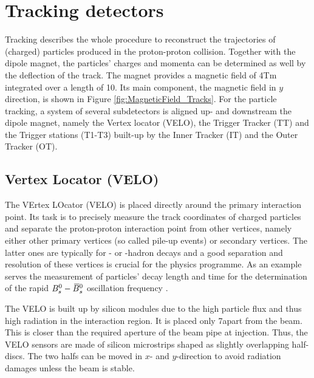 \section{Tracking detectors}
Tracking describes the whole procedure to reconstruct the trajectories of (charged) particles produced in the proton-proton collision. 
Together with the dipole magnet, the particles' charges and momenta can be determined as well by the deflection of the track.
The magnet provides a magnetic field of 4\unit{Tm} integrated over a length of 10\m.
Its main component, the magnetic field in $y$ direction, is shown in Figure \ref{fig:MagneticField_Tracks}.
For the particle tracking, a system of several subdetectors is aligned up- and downstream the dipole magnet, namely the Vertex locator (VELO), the Trigger Tracker (TT) and the Trigger stations (T1-T3) built-up by the Inner Tracker (IT) and the Outer Tracker (OT).

\subsection{Vertex Locator (VELO)}
The VErtex LOcator (VELO) is placed directly around the primary interaction point. 
Its task is to precisely measure the track coordinates of charged particles and separate the proton-proton interaction point from other vertices, namely either other primary vertices (so called pile-up events) or secondary vertices. 
The latter ones are typically for \bquark- or \cquark-hadron decays \cite{VELO_TDR} and a good separation and resolution of these vertices is crucial for the \lhcb physics programme.
As an example serves the measurement of particles' decay length and time for the determination of the rapid ${{B}^0_{s}}-{{\kern 0.18em\overline{\kern -0.18em B}{}}{}^0_{s}}$ oscillation frequency \cite{BsBsbar_frequency}.

The VELO is built up by silicon modules due to the high particle flux and thus high radiation in the interaction region. 
It is placed only 7\mm apart from the beam. 
This is closer than the required aperture of the \lhcb beam pipe at injection. 
Thus, the VELO sensors are made of silicon microstrips shaped as slightly overlapping half-discs. 
The two halfs can be moved in $x$- and $y$-direction to avoid radiation damages unless the beam is stable.

